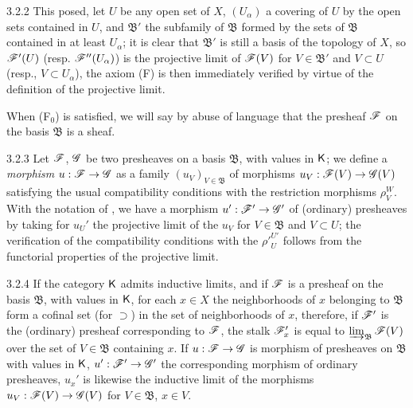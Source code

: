 \documentclass[10pt,oneside]{book}
\begin{document}
\begin{env}{3.2.2}
This posed, let $U$ be any open set of $X$, $(U_\alpha)$ a covering of $U$ by the open sets
contained in $U$, and $\mathfrak{B}'$ the subfamily of $\mathfrak{B}$ formed by the sets
of $\mathfrak{B}$ contained in at least $U_\alpha$; it is clear that $\mathfrak{B}'$ is still
a basis of the topology of $X$, so $\mathscr{F}'(U)$ (resp. $\mathscr{F}''(U_\alpha)$) is the
projective limit of $\mathscr{F}(V)$ for $V\in\mathfrak{B}'$ and $V\subset U$
(resp., $V\subset U_\alpha$), the axiom (F) is then immediately verified by virtue of the
definition of the projective limit.

When (F$_0$) is satisfied, we will say by abuse of language that the presheaf $\mathscr{F}$ on the
basis $\mathfrak{B}$ is a sheaf.
\end{env}

\begin{env}{3.2.3}
\label{env-0.3.2.3}
Let $\mathscr{F}$, $\mathscr{G}$ be two presheaves on a basis $\mathfrak{B}$, with values in $\mathsf{K}$; we
define a \emph{morphism} $u:\mathscr{F}\to\mathscr{G}$ as a family $(u_V)_{V\in\mathfrak{B}}$ of
morphisms $u_V:\mathscr{F}(V)\to\mathscr{G}(V)$ satisfying the usual compatibility conditions with the
restriction morphisms $\rho_V^W$. With the notation of , we have a morphism
$u':\mathscr{F}'\to\mathscr{G}'$ of (ordinary) presheaves by taking for $u_U'$ the projective limit of
the $u_V$ for $V\in\mathfrak{B}$ and $V\subset U$; the verification of the compatibility
conditions with the ${\rho'}_U^{U'}$ follows from the functorial properties of the projective
limit.
\end{env}

\begin{env}{3.2.4}
\label{env-0.3.2.4}
If the category $\mathsf{K}$ admits inductive limits, and if $\mathscr{F}$ is a presheaf on the basis
$\mathfrak{B}$, with values in $\mathsf{K}$, for each $x\in X$ the neighborhoods of $x$ belonging to
$\mathfrak{B}$ form a cofinal set (for $\supset$) in the set of neighborhoods of $x$,
therefore, if $\mathscr{F}'$ is the (ordinary) presheaf corresponding to $\mathscr{F}$, the stalk
$\mathscr{F}_x'$ is equal to $\varinjlim_{\mathfrak{B}}\mathscr{F}(V)$ over the set of
$V\in\mathfrak{B}$ containing $x$. If $u:\mathscr{F}\to\mathscr{G}$ is morphism of presheaves on
$\mathfrak{B}$ with values in $\mathsf{K}$, $u':\mathscr{F}'\to\mathscr{G}'$ the corresponding morphism of
ordinary presheaves, $u_x'$ is likewise the inductive limit of the morphisms
$u_V:\mathscr{F}(V)\to\mathscr{G}(V)$ for $V\in\mathfrak{B}$, $x\in V$.
\end{env}
\end{document}
